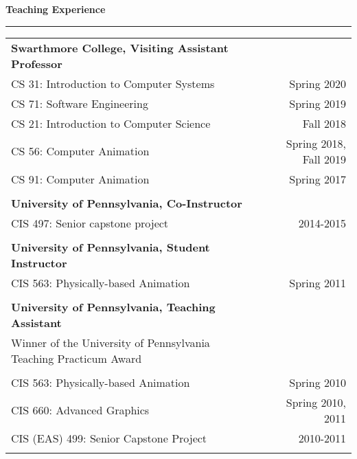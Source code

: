 \needspace{6em}
{\large {\bf Teaching Experience}}
\vspace{0.1cm}
\hrule
\begin{tabular*}{7.1in}{@{}l@{\extracolsep\fill}r}

{\bf Swarthmore College, Visiting Assistant Professor} & \\
CS 31: Introduction to Computer Systems & Spring 2020\\
CS 71: Software Engineering & Spring 2019\\
CS 21: Introduction to Computer Science & Fall 2018\\
CS 56: Computer Animation & Spring 2018, Fall 2019\\
CS 91: Computer Animation & Spring 2017\\
\phantom{yommomma} & \phantom{2002}\\

{\bf University of Pennsylvania, Co-Instructor} & \\
CIS 497: Senior capstone project & 2014-2015\\
\phantom{yommomma} & \phantom{2002}\\

{\bf University of Pennsylvania, Student Instructor} & \\
CIS 563: Physically-based Animation & Spring 2011\\
\phantom{yommomma} & \phantom{2002}\\
{\bf University of Pennsylvania, Teaching Assistant} & \\
Winner of the University of Pennsylvania Teaching Practicum Award & \\
\phantom{yommomma} & \phantom{2002}\\
CIS 563: Physically-based Animation & Spring 2010\\
CIS 660: Advanced Graphics & Spring 2010, 2011\\
CIS (EAS) 499: Senior Capstone Project  & 2010-2011\\
\phantom{yommomma} & \phantom{2002}\\
\end{tabular*}


